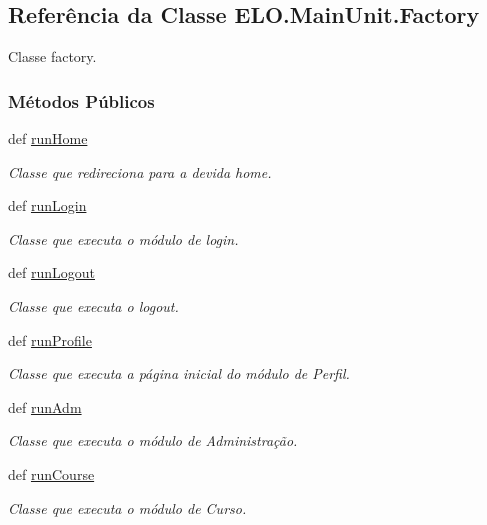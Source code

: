\hypertarget{classELO_1_1MainUnit_1_1Factory}{\subsection{Referência da Classe E\-L\-O.\-Main\-Unit.\-Factory}
\label{classELO_1_1MainUnit_1_1Factory}
}


Classe factory.  


\subsubsection*{Métodos Públicos}
\begin{DoxyCompactItemize}
\item 
def \hyperlink{classELO_1_1MainUnit_1_1Factory_a766943202ba781821cf749ca0fb133ba}{run\-Home}
\begin{DoxyCompactList}\small\item\em Classe que redireciona para a devida home. \end{DoxyCompactList}\item 
def \hyperlink{classELO_1_1MainUnit_1_1Factory_a515d1ff460a335b750e58e0cbddf20ae}{run\-Login}
\begin{DoxyCompactList}\small\item\em Classe que executa o módulo de login. \end{DoxyCompactList}\item 
def \hyperlink{classELO_1_1MainUnit_1_1Factory_aa26c51486ba65030399897a6e3b4f4f1}{run\-Logout}
\begin{DoxyCompactList}\small\item\em Classe que executa o logout. \end{DoxyCompactList}\item 
def \hyperlink{classELO_1_1MainUnit_1_1Factory_ab20a76f74180fc77c6b8fcd8de7942f1}{run\-Profile}
\begin{DoxyCompactList}\small\item\em Classe que executa a página inicial do módulo de Perfil. \end{DoxyCompactList}\item 
def \hyperlink{classELO_1_1MainUnit_1_1Factory_a533b402a54bf6f6715824a8687fa7a24}{run\-Adm}
\begin{DoxyCompactList}\small\item\em Classe que executa o módulo de Administração. \end{DoxyCompactList}\item 
def \hyperlink{classELO_1_1MainUnit_1_1Factory_a5e360bc5396fd576e0614b9e157b3816}{run\-Course}
\begin{DoxyCompactList}\small\item\em Classe que executa o módulo de Curso. \end{DoxyCompactList}\end{DoxyCompactItemize}



